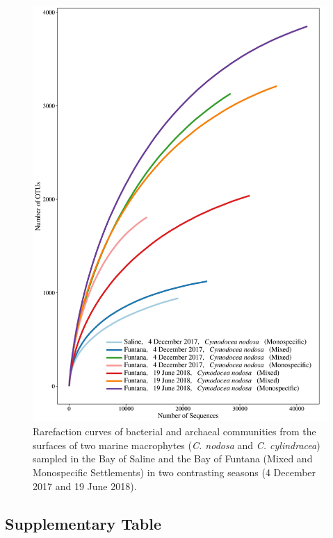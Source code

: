\documentclass[
  12pt,
]{article}
\begin{document}
\begin{figure}[H]

{\centering \includegraphics[width=0.8\linewidth]{../results/figures/rarefaction} 

}

\caption{Rarefaction curves of bacterial and archaeal communities from the surfaces of two marine macrophytes (\textit{C. nodosa} and \textit{C. cylindracea}) sampled in the Bay of Saline and the Bay of Funtana (Mixed and Monospecific Settlements) in two contrasting seasons (4 December 2017 and 19 June 2018).\label{rarefaction}}\label{fig:unnamed-chunk-1}
\end{figure}

\newpage

\hypertarget{supplementary-table}{%
\subsection{Supplementary Table}\label{supplementary-table}}

\begingroup\fontsize{9}{11}\selectfont
\end{document}
